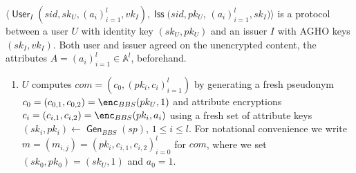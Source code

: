 \documentclass[runningheads]{llncs}
\DeclareMathOperator{\issuer}{\mathsf{Iss}}
\DeclareMathOperator{\user}{\mathsf{User}}
\DeclareMathOperator{\gen}{\mathsf{Gen}}
\begin{document}
\begin{definition}
\label{prot:issuance}
$\big\langle \user_I(sid, sk_U, (a_i)_{i=1}^l, vk_I), \issuer(sid, {pk_U}$, $(a_i)_{i=1}^l, sk_I)\big\rangle$
is a protocol between a user $U$ with identity key $(sk_U,pk_U)$ and an issuer $I$ with AGHO keys $(sk_I,vk_I)$. %
Both user and issuer agreed on the unencrypted content, the attributes $A = (a_i)_{i=1}^l\in \mathbb A^l$, beforehand.
\begin{enumerate}
\item
$U$ computes $com = \left(c_0, (pk_i,c_i)_{i=1}^l\right)$  by generating a fresh  pseudonym $c_0 = (c_{0,1},c_{0,2}) = \enc_{BBS}(pk_U, 1)$ and  attribute encryptions $c_i = (c_{i,1}, c_{i,2}) = \enc_{BBS}(pk_i, a_i)$ using a fresh set of attribute keys $(sk_i,pk_i)\leftarrow\gen_{BBS}(sp)$, $1\leq i \leq l$.
For notational convenience we write $m=(m_{i,j}) = ( pk_i,c_{i,1},c_{i,2})_{i=0}^l $ for  $com$, where we set $(sk_0,pk_0)=(sk_U,1)$ and $a_0=1$.


\end{enumerate}
\end{definition}
\end{document}
